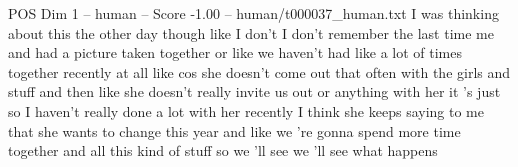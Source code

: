 \begin{textsample}{POS Dim 1 – human – Score -1.00 – human/t000037\_human.txt}  \label{ex:f1_pos_012}
I was thinking about this the other day though like I don't I don't remember the last time me and had a picture taken together or like we haven't had like a lot of times together recently at all like cos she doesn't come out that often with the girls and stuff and then like she doesn't really invite us out or anything with her it 's just so I haven't really done a lot with her recently I think she keeps saying to me that she wants to change this year and like we 're gonna spend more time together and all this kind of stuff so we 'll see we 'll see what happens

\end{textsample}
